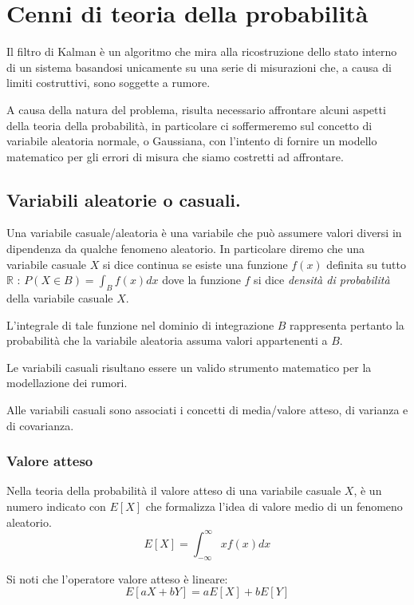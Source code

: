 \section{Cenni di teoria della probabilità}

Il filtro di Kalman è un algoritmo che mira alla ricostruzione dello stato interno di un sistema basandosi unicamente su una serie di misurazioni che, a causa di limiti costruttivi, sono soggette a rumore.

A causa della natura del problema, risulta necessario affrontare alcuni aspetti della teoria della probabilità, in particolare ci soffermeremo sul concetto di variabile aleatoria normale, o Gaussiana, con l'intento di fornire un modello matematico per gli errori di misura che siamo costretti ad affrontare.

\subsection{Variabili aleatorie o casuali.}

Una variabile casuale/aleatoria è una variabile che può assumere valori diversi in dipendenza da qualche fenomeno aleatorio.
In particolare diremo che una variabile casuale $X$ si dice continua se esiste una funzione $f(x)$ definita su tutto $\mathbb{R}$ : $P(X \in B) = \int_B f(x) dx$ dove la funzione $f$ si dice \textit{densità di probabilità} della variabile casuale $X$.

L'integrale di tale funzione nel dominio di integrazione $B$ rappresenta pertanto la probabilità che la variabile aleatoria assuma valori appartenenti a $B$.

Le variabili casuali risultano essere un valido strumento matematico per la modellazione dei rumori.

Alle variabili casuali sono associati i concetti di media/valore atteso, di varianza e di covarianza.

\subsubsection{Valore atteso}

Nella teoria della probabilità il valore atteso di una variabile casuale $X$, è un numero indicato con $E[X]$ che formalizza l'idea di valore medio di un fenomeno aleatorio.
\begin{equation}
E[X]=\int _{{-\infty }}^{{\infty }}xf(x)dx
\end{equation}

\noindent  Si noti che l'operatore valore atteso è lineare:
\begin{equation}
E[aX + bY] = aE[X] + bE[Y]
\end{equation}


